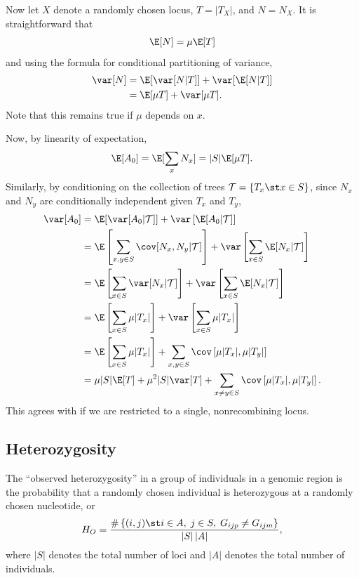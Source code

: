 Now let $X$ denote a randomly chosen locus,
$T = |T_X|$, and $N = N_X$.
It is straightforward that
\begin{align}
  \E[N] = \mu \E[T]
\end{align}
and using the formula for conditional partitioning of variance,
\begin{align}
  \var[N] &= \E[ \var[N|T] ] + \var[ \E[N|T] ] \\
    &= \E[ \mu T ] + \var[ \mu T ] .
\end{align}
Note that this remains true if $\mu$ depends on $x$.

Now, by linearity of expectation,
\begin{align}
  \E[A_0] = \E[ \sum_x N_x] = |S| \E[\mu T] .
\end{align}
Similarly, by conditioning on the collection of trees $\mathcal{T} = \{ T_x \st x \in S\}$,
since $N_x$ and $N_y$ are conditionally independent given $T_x$ and $T_y$,
\begin{align}
  \var[A_0] &= \E[ \var[A_0 | \mathcal{T} ] ] + \var\left[ \E[ A_0 | \mathcal{T} ] \right] \\
  &= \E \left[ \sum_{x,y\in S} \cov[N_x,N_y|\mathcal{T}] \right] + \var\left[ \sum_{x \in S} \E[ N_x | \mathcal{T} ] \right] \\
  &= \E \left[ \sum_{x\in S} \var[N_x|\mathcal{T}] \right] + \var\left[ \sum_{x \in S} \E[ N_x | \mathcal{T} ] \right] \\
  &= \E \left[ \sum_{x \in S} \mu |T_x| \right] + \var\left[ \sum_{x \in S} \mu |T_x| \right] \\
  &= \E \left[ \sum_{x \in S} \mu |T_x| \right] + \sum_{x,y \in S} \cov\left[ \mu |T_x|, \mu |T_y| \right] \\
  &= \mu |S| \E [ T ] + \mu^2 |S| \var[T] + \sum_{x \neq y \in S} \cov\left[ \mu |T_x|, \mu |T_y| \right] .
\end{align}
This agrees with \citet{hudson1990gene} if we are restricted to a single, nonrecombining locus.


\subsection{Heterozygosity} 

The ``observed heterozygosity'' in a group of individuals in a genomic region 
is the probability that a randomly chosen individual is heterozygous at a randomly chosen nucleotide,
or 
\begin{align}
  H_O = \frac{ \# \left\{ (i,j) \st i \in A, \; j \in S, \; G_{ijp} \neq G_{ijm} \right\} }{ |S|\,|A| } ,
\end{align}
where $|S|$ denotes the total number of loci and $|A|$ denotes the total number of individuals.

